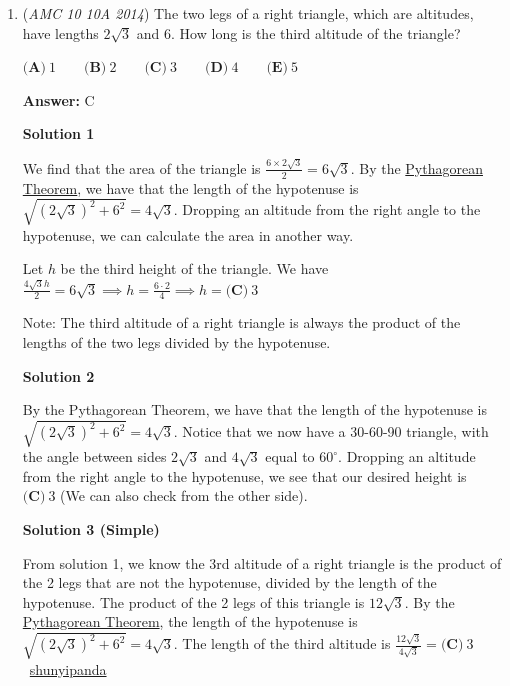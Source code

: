 \begin{enumerate}
 


	\item (\textit{AMC 10 10A 2014}) The two legs of a right triangle, which are altitudes, have lengths $2\sqrt3$ and $6$. How long is the third altitude of the triangle?


 $\textbf{(A)}\ 1\qquad\textbf{(B)}\ 2\qquad\textbf{(C)}\ 3\qquad\textbf{(D)}\ 4\qquad\textbf{(E)}\ 5$

 \textbf{Answer: }C



\textbf{Solution 1}

We find that the area of the triangle is $\frac{6\times 2\sqrt{3}}{2} =6\sqrt{3}$. By the \href{https://artofproblemsolving.com/wiki/index.php?title=Pythagorean\_Theorem}{Pythagorean Theorem}, we have that the length of the hypotenuse is $\sqrt{(2\sqrt{3})^2+6^2}=4\sqrt{3}$. Dropping an altitude from the right angle to the hypotenuse, we can calculate the area in another way.

 Let $h$ be the third height of the triangle. We have $\frac{4\sqrt{3}h}{2}=6\sqrt{3}\implies h = \frac{6 \cdot 2}{4} \implies h=\boxed{\textbf{(C)}\ 3}$

 Note: The third altitude of a right triangle is always the product of the lengths of the two legs divided by the hypotenuse.

 



\textbf{Solution 2}

By the Pythagorean Theorem, we have that the length of the hypotenuse is $\sqrt{(2\sqrt{3})^2+6^2}=4\sqrt{3}$. Notice that we now have a 30-60-90 triangle, with the angle between sides $2\sqrt{3}$ and $4\sqrt{3}$ equal to $60^{\circ}$. Dropping an altitude from the right angle to the hypotenuse, we see that our desired height is $\boxed{\textbf{(C)}\ 3}$ (We can also check from the other side).

 



\textbf{Solution 3 (Simple)}

From solution 1, we know the 3rd altitude of a right triangle is the product of the 2 legs that are not the hypotenuse, divided by the length of the hypotenuse. The product of the 2 legs of this triangle is $12\sqrt{3}$. By the \href{https://artofproblemsolving.com/wiki/index.php?title=Pythagorean\_Theorem}{Pythagorean Theorem}, the length of the hypotenuse is $\sqrt{(2\sqrt{3})^2+6^2}=4\sqrt{3}$. The length of the third altitude is $\frac{12\sqrt{3}}{4\sqrt{3}}=\boxed{\textbf{(C)}\ 3}$~\href{https://artofproblemsolving.com/wiki/index.php?title=Shunyipanda&action=edit&redlink=1}{shunyipanda}


\end{enumerate}
